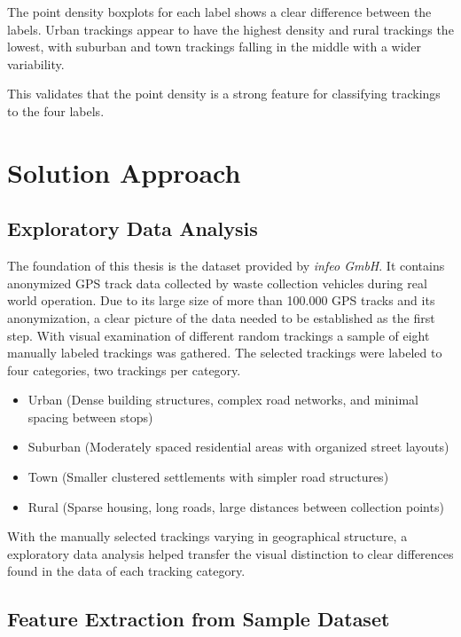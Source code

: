 \documentclass[a4paper,12pt,twoside]{scrreprt}
\begin{document}
The point density boxplots for each label shows a clear difference between the
labels. Urban trackings appear to have the highest density and rural trackings
the lowest, with suburban and town trackings falling in the middle with a wider
variability.

This validates that the point density is a strong feature for classifying
trackings to the four labels.

\section{Solution Approach}

\subsection{Exploratory Data Analysis}

The foundation of this thesis is the dataset provided by \textit{infeo GmbH}.
It contains anonymized GPS track data collected by waste collection vehicles
during real world operation. Due to its large size of more than 100.000 GPS
tracks and its anonymization, a clear picture of the data needed to be
established as the first step.
With visual examination of different random trackings a sample of eight
manually labeled trackings was gathered.
The selected trackings were labeled to four categories, two trackings per
category.

\begin{itemize}
  \item Urban (Dense building structures, complex road networks, and minimal
        spacing between stops)
  \item Suburban (Moderately spaced residential areas with organized street
        layouts)
  \item Town (Smaller clustered settlements with simpler road structures)
  \item Rural (Sparse housing, long roads, large distances between collection
        points)
\end{itemize}

With the manually selected trackings varying in geographical structure, a
exploratory data
analysis helped transfer the visual distinction to clear differences found in
the data of each tracking category.

\subsection{Feature Extraction from Sample Dataset}
\end{document}
